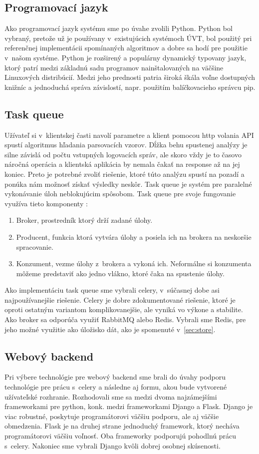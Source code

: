 \subsection{Programovací jazyk}
Ako programovací jazyk systému sme po úvahe zvolili Python. Python bol vybraný, pretože už je používany v~existujúcich systémoch ÚVT, bol použitý pri referenčnej implementácii spomínaných algoritmov a dobre sa hodí pre použitie v~našom systéme. Python je rozširený a populárny dynamický typovany jazyk, ktorý patrí medzi základnú sadu programov nainštalovaných na väčšine Linuxových distribúcií. Medzi jeho prednosti patria široká škála voľne dostupných knižníc a jednoduchá správa závislostí, napr. použitím balíčkovacieho správcu pip. 

\subsection{Task queue}
Užívateľ si v~klientskej časti navolí parametre a klient pomocou http volania API spustí algoritmus hľadania parsovacích vzorov.
Dĺžka behu spustenej analýzy je silne závislá od počtu vstupných logovacích správ, ale skoro vždy je to časovo náročná operácia a klientská aplikácia by nemala čakať na response až na jej koniec. Preto je potrebné zvoliť riešenie, ktoré túto analýzu spustí na pozadí a ponúka nám možnosť získať výsledky neskôr. Task queue je systém pre paralelné vykonávanie úloh neblokujúcim spôsobom. Task queue pre svoje fungovanie využíva tieto komponenty :

\begin{enumerate}
  \item Broker, prostredník ktorý drží zadané úlohy.
  \item Producent, funkcia ktorá vytvára úlohy a posiela ich na brokera na neskoršie spracovanie.
  \item Konzument, vezme úlohy z~brokera a vykoná ich. Neformálne si konzumenta môžeme predstaviť ako jedno vlákno, ktoré čaka na spustenie úlohy.
\end{enumerate}

Ako implementáciu task queue sme vybrali celery, v~súčasnej dobe asi najpoužívanejšie riešenie. Celery je dobre zdokumentované riešenie, ktoré je oproti ostatným variantom komplikovanejšie, ale vyniká vo výkone a stabilite. Ako broker sa odporúča využiť RabbitMQ alebo Redis. Vybrali sme Redis, pre jeho možné využitie ako úložisko dát, ako je spomenuté v~\ref{sec:store}.

\subsection{Webový backend}
Pri výbere technológie pre webový backend sme brali do úvahy podporu technológie pre prácu s~celery a následne aj formu, akou bude vytvorené užívateľské rozhranie. Rozhodovali sme sa medzi dvoma najzámejšími frameworkami pre python, konk. medzi frameworkami Django a Flask. Django je viac robustné, poskytuje programátorovi väčšiu podporu, ale aj väčšie obmedzenia. Flask je na druhej strane jednoduchý framework, ktorý necháva programátorovi väčšiu voľnosť. Oba frameworky podporujú pohodlnú prácu s~celery. Nakoniec sme vybrali Django kvôli dobrej osobnej skúsenosti.


